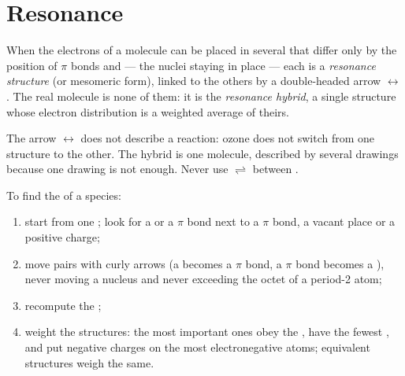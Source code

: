 \section{Resonance}

\begin{definition}\label{def:b1:lewis-resonance-vsepr:resonance}
When the electrons of a molecule can be placed in several  that differ only by the position of $\pi$ bonds and  --- the nuclei staying in place --- each is a \emph{resonance
structure} (or mesomeric form), linked to the
others by a double-headed arrow $\leftrightarrow$. The real molecule is
none of them: it is the \emph{resonance hybrid},
a single structure whose electron distribution is a weighted average of
theirs.
\end{definition}

\begin{remark}\label{rem:b1:lewis-resonance-vsepr:arrow}
The arrow $\leftrightarrow$ does not describe a reaction: ozone does not
switch from one structure to the other. The hybrid is one molecule,
described by several drawings because one drawing is not enough. Never
use $\rightleftharpoons$ between .
\end{remark}

\begin{method}\label{met:b1:lewis-resonance-vsepr:resonance}
To find the  of a species:
\begin{enumerate}
  \item start from one ; look for a  or a
        $\pi$ bond next to a $\pi$ bond, a vacant place or a positive
        charge;
  \item move pairs with curly arrows (a  becomes a $\pi$ bond, a
        $\pi$ bond becomes a ), never moving a nucleus and never
        exceeding the octet of a period-2 atom;
  \item recompute the ;
  \item weight the structures: the most important ones obey the , have the fewest , and put negative charges on
        the most electronegative atoms; equivalent structures weigh the
        same.
\end{enumerate}
\end{method}

